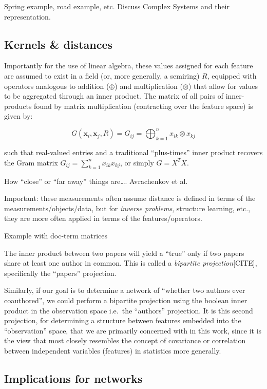 \documentclass[%
	12pt,
		oneside,
		letterpaper
]{book}
\begin{document}
Spring example, road example, etc. Discuss Complex Systems and their
representation.

\subsection{Kernels \& distances}\label{kernels-distances}

Importantly for the use of linear algebra, these values assigned for
each feature are assumed to exist in a field (or, more generally, a
semiring) \(R\), equipped with operators analogous to addition
(\(\oplus\)) and multiplication (\(\otimes\)) that allow for values to
be aggregated through an inner product. The matrix of all pairs of
inner-products found by matrix multiplication (contracting over the
feature space) is given by:

\[G(\mathbf{x}_i, \mathbf{x}_j,R) = G_{ij} = \bigoplus_{k=1}^{n} x_{ik} \otimes x_{kj} \]

such that real-valued entries and a traditional ``plus-times'' inner
product recovers the Gram matrix \(G_{ij}=\sum_{k=1}^{n} x_{ik}x_{kj}\),
or simply \(G=X^TX\).

How ``close'' or ``far away'' things are\ldots. Avrachenkov et al.~

Important: these measurements often assume distance is defined in terms
of the measurements/objects/data, but for \emph{inverse problems},
structure learning, etc., they are more often applied in terms of the
features/operators.

Example with doc-term matrices

The inner product between two papers will yield a ``true'' only if two
papers share at least one author in common. This is called a
\emph{bipartite projection}{[}CITE{]}, specifically the ``papers''
projection.

Similarly, if our goal is to determine a network of ``whether two
authors ever coauthored'', we could perform a bipartite projection using
the boolean inner product in the observation space i.e.~the ``authors''
projection. It is this second projection, for determining a structure
between features embedded into the ``observation'' space, that we are
primarily concerned with in this work, since it is the view that most
closely resembles the concept of covariance or correlation between
independent variables (features) in statistics more generally.

\subsection{Implications for networks}\label{implications-for-networks}
\end{document}

